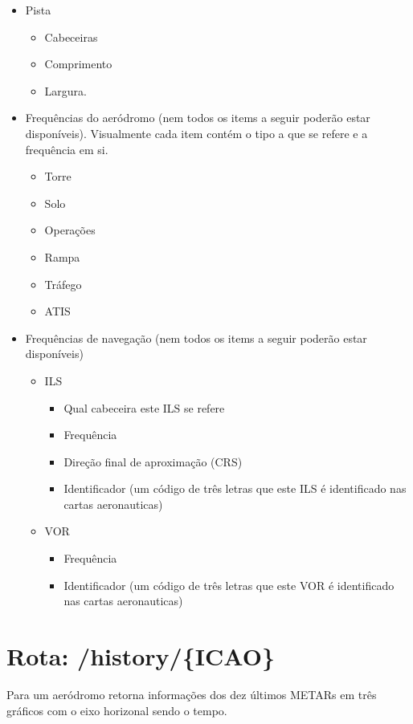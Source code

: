 \begin{itemize}
    \item Pista
        \begin {itemize}
        \item Cabeceiras
        \item Comprimento
        \item Largura.
        \end {itemize}
    \item Frequências do aeródromo (nem todos os items a seguir poderão estar disponíveis). Visualmente cada item contém o tipo a que se refere e a frequência em si.
    \begin{itemize}
        \item Torre
        \item Solo
        \item Operações
        \item Rampa
        \item Tráfego
        \item ATIS
    \end{itemize}
    \item Frequências de navegação (nem todos os items a seguir poderão estar disponíveis)
    \begin{itemize}
        \item ILS
            \begin{itemize}
                \item Qual cabeceira este ILS se refere
                \item Frequência
                \item Direção final de aproximação (CRS)
                \item Identificador (um código de três letras que este ILS é identificado nas cartas aeronauticas)
            \end{itemize}
        \item VOR
            \begin{itemize}
                \item Frequência
                \item Identificador (um código de três letras que este VOR é identificado nas cartas aeronauticas)
            \end{itemize}
    \end{itemize}
\end{itemize}

\section{Rota: /history/\{ICAO\}}
Para um aeródromo retorna informações dos dez últimos METARs em três
gráficos com o eixo horizonal sendo o tempo.

